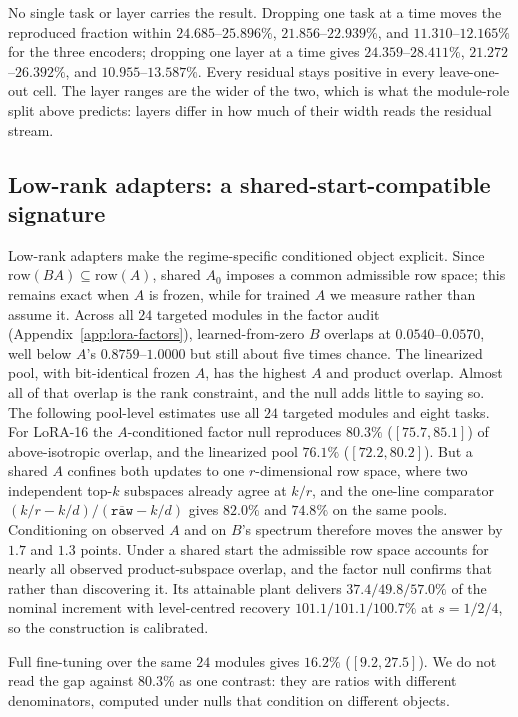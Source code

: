 No single task or layer carries the result. Dropping one task at a time moves the reproduced
fraction within $24.685$--$25.896\%$, $21.856$--$22.939\%$, and $11.310$--$12.165\%$ for the three
encoders; dropping one layer at a time gives $24.359$--$28.411\%$, $21.272$--$26.392\%$, and
$10.955$--$13.587\%$. Every residual stays positive in every leave-one-out cell. The layer ranges
are the wider of the two, which is what the module-role split above predicts: layers differ in how
much of their width reads the residual stream.

\subsection{Low-rank adapters: a shared-start-compatible signature}
\label{sec:lora}

Low-rank adapters make the regime-specific conditioned object explicit. Since
$\mathrm{row}(BA)\subseteq\mathrm{row}(A)$, shared $A_0$ imposes a common admissible row space;
this remains exact when $A$ is frozen, while for trained $A$ we measure rather than assume it.
Across all $24$ targeted modules in the factor audit (Appendix~\ref{app:lora-factors}),
learned-from-zero $B$ overlaps at $0.0540$--$0.0570$, well below $A$'s
$0.8759$--$1.0000$ but still about five times chance. The
linearized pool, with bit-identical frozen $A$, has the highest $A$ and product overlap.
Almost all of that overlap is the rank constraint, and the null adds little to saying so. The
following pool-level estimates use all $24$ targeted modules and eight tasks. For LoRA-16 the
$A$-conditioned factor null reproduces $80.3\%$ ($[75.7,85.1]$) of above-isotropic overlap, and the
linearized pool $76.1\%$ ($[72.2,80.2]$). But a shared $A$ confines both updates to one
$r$-dimensional row space, where two independent top-$k$ subspaces already agree at $k/r$, and the
one-line comparator $(k/r-k/d)/(\overline{\texttt{raw}}-k/d)$ gives $82.0\%$ and $74.8\%$ on the same
pools. Conditioning on observed $A$ and on $B$'s spectrum therefore moves the answer by $1.7$ and
$1.3$ points. Under a shared start the admissible row space accounts for nearly all observed
product-subspace overlap, and the factor null confirms that rather than discovering it. Its
attainable plant delivers $37.4/49.8/57.0\%$ of the nominal increment with level-centred recovery
$101.1/101.1/100.7\%$ at $s=1/2/4$, so the construction is calibrated.

Full fine-tuning over the same $24$ modules gives $16.2\%$ ($[9.2,27.5]$). We do not read the gap
against $80.3\%$ as one contrast: they are ratios with different denominators, computed under nulls
that condition on different objects.

